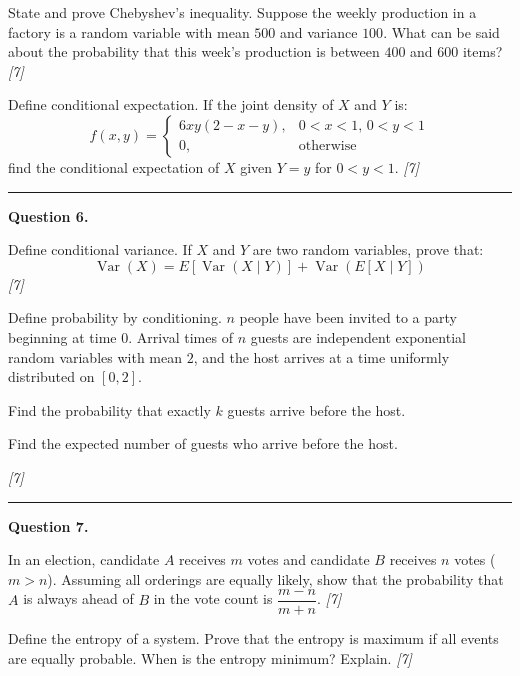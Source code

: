 \documentclass[11pt,a4paper]{article}
\newcommand{\pts}[1]{\hfill   \textit{[#1]}}
\begin{document}
\begin{parts}
  \item State and prove Chebyshev's inequality. Suppose the weekly production in a factory is a random variable with mean $500$ and variance $100$. What can be said about the probability that this week's production is between $400$ and $600$ items? \pts{7}
  \item Define conditional expectation. If the joint density of $X$ and $Y$ is:
  \[
  f(x,y) = 
\begin{cases} 6xy(2-x-y), & 0 < x < 1,\, 0 < y < 1 \\ 0, &  \text{otherwise} \end{cases}
  \]
  find the conditional expectation of $X$ given $Y = y$ for $0 < y < 1$. \pts{7}
\end{parts}

\medskip\rule{\linewidth}{0.2pt}

\medskip


\noindent   \textbf{Question 6.}

\begin{parts}
  \item Define conditional variance. If $X$ and $Y$ are two random variables, prove that:
  \[
  \operatorname{Var}(X) = E[\operatorname{Var}(X \mid Y)] + \operatorname{Var}(E[X \mid Y])
  \] \pts{7}
  \item Define probability by conditioning. $n$ people have been invited to a party beginning at time $0$. Arrival times of $n$ guests are independent exponential random variables with mean $2$, and the host arrives at a time uniformly distributed on $[0, 2]$.
  
\begin{parts}
    \item Find the probability that exactly $k$ guests arrive before the host.
    \item Find the expected number of guests who arrive before the host.
  \end{parts} \pts{7}
\end{parts}

\medskip\rule{\linewidth}{0.2pt}

\medskip


\noindent   \textbf{Question 7.}

\begin{parts}
  \item In an election, candidate $A$ receives $m$ votes and candidate $B$ receives $n$ votes ($m > n$). Assuming all orderings are equally likely, show that the probability that $A$ is always ahead of $B$ in the vote count is $\dfrac{m - n}{m + n}$. \pts{7}
  \item Define the entropy of a system. Prove that the entropy is maximum if all events are equally probable. When is the entropy minimum? Explain. \pts{7}
\end{parts}
\end{document}
